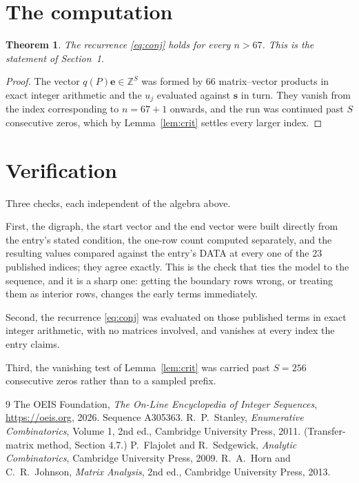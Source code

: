 \documentclass[11pt,a4paper]{article}
\theoremstyle{plain}
\newtheorem{theorem}{Theorem}
\theoremstyle{definition}
\begin{document}
\section{The computation}

\begin{theorem}
The recurrence \eqref{eq:conj} holds for every $n>67$. This is the statement of
Section~1.
\end{theorem}

\begin{proof}
The vector $q(P)\mathbf{e}\in\mathbb{Z}^{S}$ was formed by $66$ matrix--vector
products in exact integer arithmetic and the $u_j$ evaluated against $\mathbf{s}$ in turn.
They vanish from the index corresponding to $n=67+1$ onwards, and the run was continued
past $S$ consecutive zeros, which by Lemma~\ref{lem:crit} settles every larger index.
\end{proof}

\section{Verification}

Three checks, each independent of the algebra above.

First, the digraph, the start vector and the end vector were built directly from the
entry's stated condition, the one-row count computed separately, and the resulting values
compared against the entry's DATA at every one of the $23$ published indices; they
agree exactly. This is the check that ties the model to the sequence, and it is a sharp one:
getting the boundary rows wrong, or treating them as interior rows, changes the early terms
immediately.

Second, the recurrence \eqref{eq:conj} was evaluated on those published terms in exact
integer arithmetic, with no matrices involved, and vanishes at every index the entry claims.

Third, the vanishing test of Lemma~\ref{lem:crit} was carried past $S=256$ consecutive
zeros rather than to a sampled prefix.

\begin{thebibliography}{9}
 The OEIS Foundation, \emph{The On-Line Encyclopedia of Integer
Sequences}, \url{https://oeis.org}, 2026. Sequence A305363.
 R.~P.~Stanley, \emph{Enumerative Combinatorics}, Volume 1, 2nd ed.,
Cambridge University Press, 2011. (Transfer-matrix method, Section 4.7.)
 P.~Flajolet and R.~Sedgewick, \emph{Analytic Combinatorics}, Cambridge
University Press, 2009.
 R.~A.~Horn and C.~R.~Johnson, \emph{Matrix Analysis}, 2nd ed., Cambridge
University Press, 2013.
\end{thebibliography}
\end{document}
